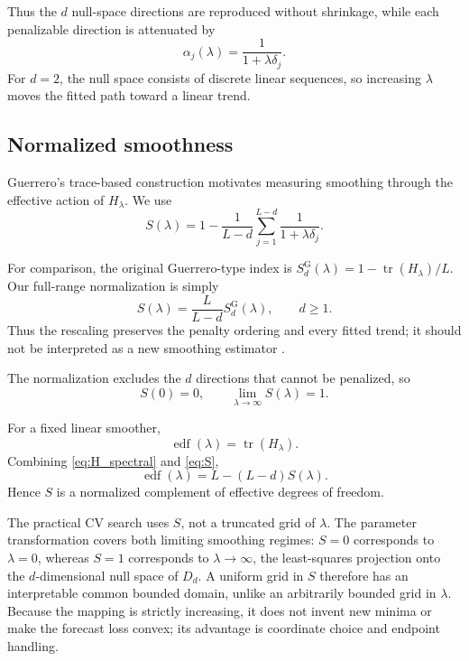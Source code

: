 Thus the $d$ null-space directions are reproduced without shrinkage, while each penalizable direction is attenuated by
\begin{equation}
\label{eq:spectral_shrinkage}
\alpha_j(\lambda)=\frac{1}{1+\lambda\delta_j}.
\end{equation}
For $d=2$, the null space consists of discrete linear sequences, so increasing $\lambda$ moves the fitted path toward a linear trend.

\subsection{Normalized smoothness}

Guerrero's trace-based construction motivates measuring smoothing through the effective action of $H_\lambda$. We use
\begin{equation}
\label{eq:S}
S(\lambda)
=
1-
\frac{1}{L-d}
\sum_{j=1}^{L-d}
\frac{1}{1+\lambda\delta_j}.
\end{equation}

For comparison, the original Guerrero-type index is
$S^{\mathrm{G}}_d(\lambda)=1-\operatorname{tr}(H_\lambda)/L$.
Our full-range normalization is simply
\begin{equation}
\label{eq:smoothness_index_rescaling}
S(\lambda)=\frac{L}{L-d}S^{\mathrm{G}}_d(\lambda),
\qquad d\ge1.
\end{equation}
Thus the rescaling preserves the penalty ordering and every fitted trend;
it should not be interpreted as a new smoothing estimator
\cite{guerrero2007penalized,cortes2017smoothness}.

The normalization excludes the $d$ directions that cannot be penalized, so
\begin{equation}
\label{eq:smoothness_endpoints}
S(0)=0,
\qquad
\lim_{\lambda\to\infty}S(\lambda)=1.
\end{equation}

For a fixed linear smoother,
\begin{equation}
\label{eq:edf_definition}
\operatorname{edf}(\lambda)=\operatorname{tr}(H_\lambda).
\end{equation}
Combining \cref{eq:H_spectral} and \cref{eq:S},
\begin{equation}
\label{eq:edf}
\boxed{
\operatorname{edf}(\lambda)
=
L-(L-d)S(\lambda).
}
\end{equation}
Hence $S$ is a normalized complement of effective degrees of freedom.

The practical CV search uses $S$, not a truncated grid of $\lambda$.
The parameter transformation covers both limiting smoothing regimes:
$S=0$ corresponds to $\lambda=0$, whereas $S=1$ corresponds to
$\lambda\to\infty$, the least-squares projection onto the
$d$-dimensional null space of $D_d$. A uniform grid in $S$
therefore has an interpretable common bounded domain, unlike an
arbitrarily bounded grid in $\lambda$. Because the mapping is
strictly increasing, it does not invent new minima or make the
forecast loss convex; its advantage is coordinate choice and
endpoint handling.
